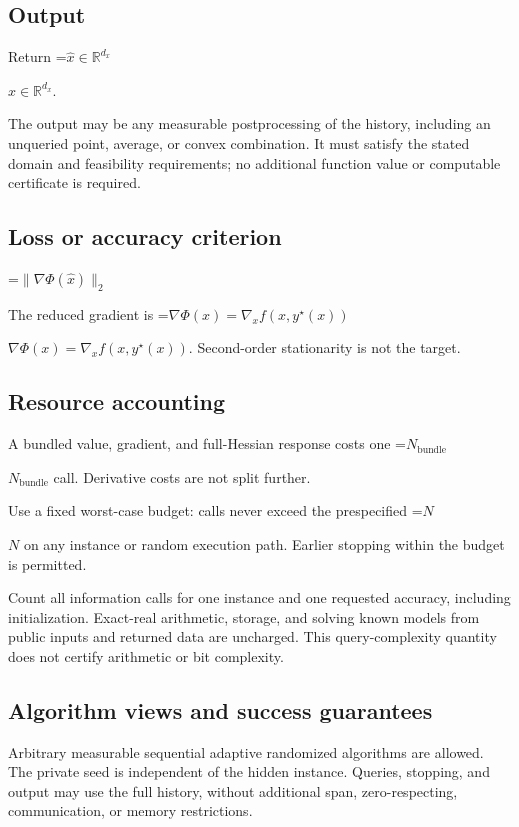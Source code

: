 \documentclass[10pt,a4paper]{article}
\newcommand{\AtlasMath}[1]{\par\begingroup\centering\setbox0=\hbox{$\displaystyle #1$}\ifdim\wd0>1.4\linewidth\typeout{ATLAS WIDE FORMULA: \the\wd0}\fi\ifdim\wd0>\linewidth\resizebox{\linewidth}{!}{\box0}\else\box0\fi\par\endgroup}
\newcommand{\AtlasInlineMath}[1]{\begingroup\setbox0=\hbox{$#1$}\ifdim\wd0>.4\linewidth\endgroup\AtlasMath{#1}\else\endgroup$#1$\fi}
\begin{document}
\subsection{Output}
Return \AtlasInlineMath{\widehat x\in\mathbb R^{d_x}}.

The output may be any measurable postprocessing of the history, including an unqueried point, average, or convex combination. It must satisfy the stated domain and feasibility requirements; no additional function value or computable certificate is required.

\subsection{Loss or accuracy criterion}

\AtlasMath{\|\nabla\Phi(\widehat{x})\|_2}


The reduced gradient is \AtlasInlineMath{\nabla\Phi(x)=\nabla_xf(x,y^\star(x))}. Second-order stationarity is not the target.

\subsection{Resource accounting}
A bundled value, gradient, and full-Hessian response costs one \AtlasInlineMath{N_{\mathrm{bundle}}} call. Derivative costs are not split further.

Use a fixed worst-case budget: calls never exceed the prespecified \AtlasInlineMath{N} on any instance or random execution path. Earlier stopping within the budget is permitted.

Count all information calls for one instance and one requested accuracy, including initialization. Exact-real arithmetic, storage, and solving known models from public inputs and returned data are uncharged. This query-complexity quantity does not certify arithmetic or bit complexity.

\subsection{Algorithm views and success guarantees}
Arbitrary measurable sequential adaptive randomized algorithms are allowed. The private seed is independent of the hidden instance. Queries, stopping, and output may use the full history, without additional span, zero-respecting, communication, or memory restrictions.
\end{document}

